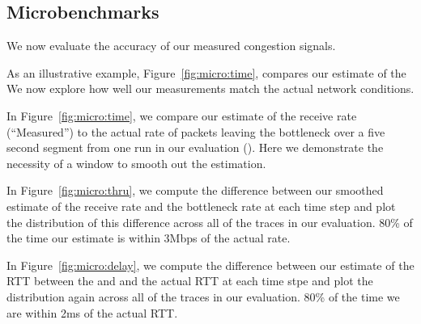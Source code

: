 \subsection{Microbenchmarks}
\label{s:measure:microbench}
    
    
    We now evaluate the accuracy of our measured congestion signals. 
    
    As an illustrative example, Figure~\ref{fig:micro:time}, compares our estimate of the 
    We now explore how well our measurements match the actual network conditions. 

    In Figure~\ref{fig:micro:time}, we compare our estimate of the receive rate (``Measured'')
    to the actual rate of packets 
    leaving the bottleneck over a five second segment from one run in our evaluation ().
    Here we demonstrate the necessity of a window to smooth out the estimation.

    In Figure~\ref{fig:micro:thru}, we compute the difference between our smoothed estimate of the receive rate 
    and the bottleneck rate at each time step and plot the distribution of this difference across
    all of the traces in our evaluation. 80\% of the time our estimate is within 3Mbps of the 
    actual rate.

    In Figure~\ref{fig:micro:delay}, we compute the difference between our estimate of the RTT between
    the \inbox and \outbox and the actual RTT at each time stpe and plot the distribution again
    across all of the traces in our evaluation. 80\% of the time we are within 2ms of the actual RTT.
    
